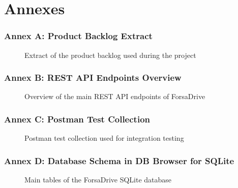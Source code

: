\chapter*{Annexes}

\subsection*{Annex A: Product Backlog Extract}
\begin{figure}[H]
    \centering
    \caption{Extract of the product backlog used during the project}
    \label{fig:annex_backlog}
\end{figure}

\subsection*{Annex B: REST API Endpoints Overview}
\begin{figure}[H]
    \centering
    \caption{Overview of the main REST API endpoints of ForsaDrive}
    \label{fig:annex_api}
\end{figure}

\subsection*{Annex C: Postman Test Collection}
\begin{figure}[H]
    \centering
    \caption{Postman test collection used for integration testing}
    \label{fig:annex_postman}
\end{figure}

\subsection*{Annex D: Database Schema in DB Browser for SQLite}
\begin{figure}[H]
    \centering
    \caption{Main tables of the ForsaDrive SQLite database}
    \label{fig:annex_db}
\end{figure}